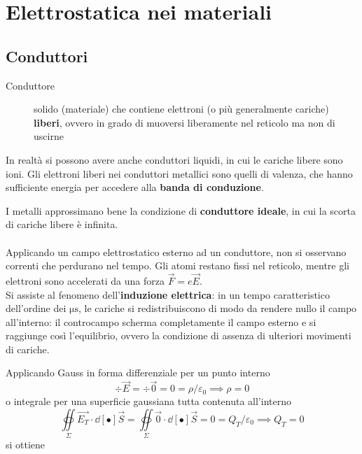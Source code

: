 \chapter{Elettrostatica nei materiali}

\section{Conduttori}
\begin{description}
\item[Conduttore] solido (materiale) che contiene elettroni (o più generalmente cariche) \textbf{liberi}, ovvero in grado di muoversi liberamente nel reticolo ma non di uscirne
\end{description}
In realtà si possono avere anche conduttori liquidi, in cui le cariche libere sono ioni. Gli elettroni liberi nei conduttori metallici sono quelli di valenza, che hanno sufficiente energia per accedere alla \textbf{banda di conduzione}. 

I metalli approssimano bene la condizione di \textbf{conduttore ideale}, in cui la scorta di cariche libere è infinita.
\\~\\
Applicando un campo elettrostatico esterno ad un conduttore, non si osservano correnti che perdurano nel tempo. Gli atomi restano fissi nel reticolo, mentre gli elettroni sono accelerati da una forza $\vec{F} = e \vec{E}$. 
\\Si assiste al fenomeno dell'\textbf{induzione elettrica}: in un tempo caratteristico dell'ordine dei $\mathrm{\mu s}$, le cariche si redistribuiscono di modo da rendere nullo il campo all'interno: il controcampo scherma completamente il campo esterno e si raggiunge così l'equilibrio, ovvero la condizione di assenza di ulteriori movimenti di cariche.


Applicando Gauss in forma differenziale per un punto interno
\[\div \vec{E} = \div \vec{0} = 0 = \rho/\varepsilon_0 \implies \rho = 0\]
o integrale per una superficie gaussiana tutta contenuta all'interno
\[\oiint\limits_\Sigma \vec{E_T} \cdot \dd[•]{\vec{S}} = \oiint\limits_\Sigma \vec{0} \cdot \dd[•]{\vec{S}} = 0 = Q_T / \varepsilon_0 \implies Q_T = 0\]
si ottiene


